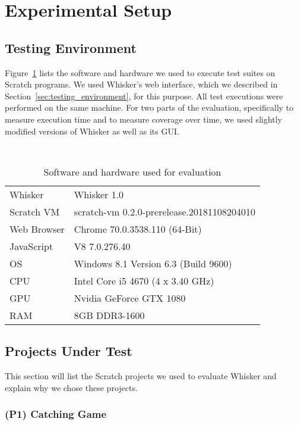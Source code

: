 \section{Experimental Setup}
\label{sec:experimental_setup}

\subsection{Testing Environment}

Figure~\ref{tab:evaluation_setup} lists the software and hardware we used to execute test suites on Scratch programs.
We used Whisker's web interface, which we described in Section~\ref{sec:testing_environment}, for this purpose.
All test executions were performed on the same machine.
For two parts of the evaluation,
specifically to measure execution time and to measure coverage over time,
we used slightly modified versions of Whisker as well as its GUI.

\begin{table}[htpb]
    \centering
    \scriptsize \tt
    \begin{tabular}{ll}
        \toprule
        Whisker     & Whisker 1.0 \\
        Scratch VM  & scratch-vm 0.2.0-prerelease.20181108204010 \\
        Web Browser & Chrome 70.0.3538.110 (64-Bit) \\
        JavaScript  & V8 7.0.276.40 \\
        OS          & Windows 8.1 Version 6.3 (Build 9600) \\
        CPU         & Intel Core i5 4670 (4 x  3.40 GHz) \\
        GPU         & Nvidia GeForce GTX 1080 \\
        RAM         & 8GB DDR3-1600 \\
        \bottomrule
    \end{tabular}
    \caption{Software and hardware used for evaluation}
    \label{tab:evaluation_setup}
\end{table}

\subsection{Projects Under Test}

This section will list the Scratch projects we used to evaluate Whisker and explain why we chose these projects.

\subsubsection{(P1) Catching Game}

